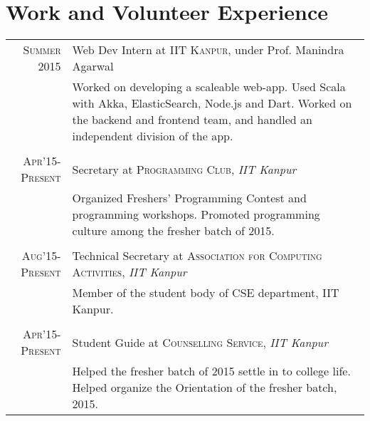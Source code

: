 \documentclass[11pt,a4paper]{article}
\begin{document}
\section*{Work and Volunteer Experience}
\begin{tabular}{r|p{11cm}}
\textsc{Summer 2015} & Web Dev Intern at \textsc{IIT Kanpur}, under Prof. Manindra Agarwal\\
&\footnotesize{Worked on developing a scaleable web-app. \newline Used Scala with Akka, ElasticSearch, Node.js and Dart. \newline Worked on the backend and frontend team, and handled an independent division of the app.}\\\multicolumn{2}{c}{} \\

\textsc{Apr'15-Present} & Secretary at \textsc{Programming Club}, \emph{IIT Kanpur}\\
&\footnotesize{Organized Freshers' Programming Contest and programming workshops. \newline Promoted programming culture among the fresher batch of 2015.}\\\multicolumn{2}{c}{} \\

\textsc{Aug'15-Present} & Technical Secretary at \textsc{\newline Association for Computing Activities}, \emph{IIT Kanpur}\\
&\footnotesize{Member of the student body of CSE department, IIT Kanpur.}\\\multicolumn{2}{c}{} \\

\textsc{Apr'15-Present} & Student Guide at \textsc{Counselling Service}, \emph{IIT Kanpur}\\
&\footnotesize{Helped the fresher batch of 2015 settle in to college life. \newline Helped organize the Orientation of the fresher batch, 2015.}

\end{tabular}

\vspace{5mm}
\end{document}
